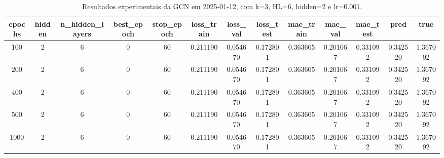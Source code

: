 \begin{table}[h]
\centering
\caption{Resultados experimentais da GCN em 2025-01-12, com k=3, HL=6, hidden=2 e lr=0.001.}
\label{tab:gcn_results_k3_hl6_h2_d20250112}
\begin{tabular}{ccccccccccccc}
\toprule
epochs & hidden & n\_hidden\_layers & best\_epoch & stop\_epoch & loss\_train & loss\_val & loss\_test & mae\_train & mae\_val & mae\_test & pred & true \\
\midrule
100 & 2 & 6 & 0 & 60 & 0.211190 & 0.054670 & 0.172801 & 0.363605 & 0.201067 & 0.331092 & 0.342520 & 1.367092 \\
200 & 2 & 6 & 0 & 60 & 0.211190 & 0.054670 & 0.172801 & 0.363605 & 0.201067 & 0.331092 & 0.342520 & 1.367092 \\
400 & 2 & 6 & 0 & 60 & 0.211190 & 0.054670 & 0.172801 & 0.363605 & 0.201067 & 0.331092 & 0.342520 & 1.367092 \\
500 & 2 & 6 & 0 & 60 & 0.211190 & 0.054670 & 0.172801 & 0.363605 & 0.201067 & 0.331092 & 0.342520 & 1.367092 \\
1000 & 2 & 6 & 0 & 60 & 0.211190 & 0.054670 & 0.172801 & 0.363605 & 0.201067 & 0.331092 & 0.342520 & 1.367092 \\
\bottomrule
\end{tabular}
\end{table}
